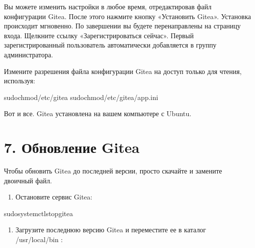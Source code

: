 \documentclass[letterpaper,10pt,russian]{sphinxmanual}
\begin{document}
\sphinxAtStartPar
Вы можете изменить настройки в любое время, отредактировав файл конфигурации Gitea.
После этого нажмите кнопку «Установить Gitea». Установка происходит мгновенно.
По завершении вы будете перенаправлены на страницу входа.
Щелкните ссылку «Зарегистрироваться сейчас». Первый зарегистрированный пользователь
автоматически добавляется в группу администратора.

\sphinxAtStartPar
Измените разрешения файла конфигурации Gitea на доступ только для чтения, используя:

\begin{sphinxVerbatim}[commandchars=\\\{\}]
\PYGZdl{}sudochmod/etc/gitea
\PYGZdl{}sudochmod/etc/gitea/app.ini
\end{sphinxVerbatim}

\sphinxAtStartPar
Вот и все. Gitea установлена на вашем компьютере с Ubuntu.


\section{7. Обновление Gitea}
\label{\detokenize{git:id6}}
\sphinxAtStartPar
Чтобы обновить Gitea до последней версии, просто скачайте и замените двоичный файл.
\begin{enumerate}
%
\item {} 
\sphinxAtStartPar
Остановите сервис Gitea:

\end{enumerate}

\begin{sphinxVerbatim}[commandchars=\\\{\}]
\PYGZdl{}sudosystemctlstopgitea
\end{sphinxVerbatim}
\begin{enumerate}
%
\setcounter{enumi}{1}
\item {} 
\sphinxAtStartPar
Загрузите последнюю версию Gitea и переместите ее в каталог /usr/local/bin :

\end{enumerate}
\end{document}
